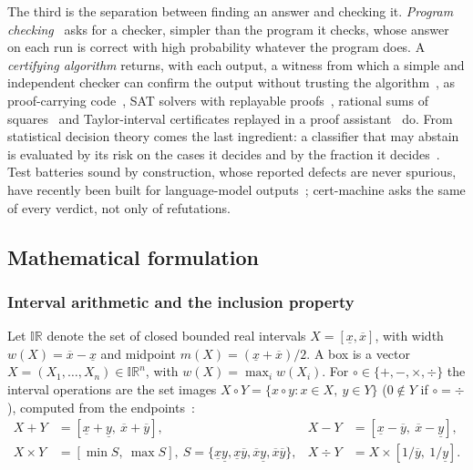 \documentclass[preprint,11pt,a4paper]{elsarticle}
\theoremstyle{definition}
\newcommand{\IR}{\mathbb{IR}}
\begin{document}
The third is the separation between finding an answer and checking it. \emph{Program checking}~\citep{BlumKannan95} asks for a checker, simpler than the program it checks, whose answer on each run is correct with high probability whatever the program does. A \emph{certifying algorithm} returns, with each output, a witness from which a simple and independent checker can confirm the output without trusting the algorithm~\citep{McConnell11}, as proof-carrying code~\citep{Necula97}, SAT solvers with replayable proofs~\citep{Wetzler14,CakeLPR21}, rational sums of squares~\citep{Parrilo03,PeyrlParrilo08} and Taylor-interval certificates replayed in a proof assistant~\citep{SolovyevHales13,Magron15,MartinDorel16} do. From statistical decision theory comes the last ingredient: a classifier that may abstain is evaluated by its risk on the cases it decides and by the fraction it decides~\citep{Chow70,ElYaniv10,Geifman17,Franc21}. Test batteries sound by construction, whose reported defects are never spurious, have recently been built for language-model outputs~\citep{Li26}; cert-machine asks the same of every verdict, not only of refutations.

\subsection{Mathematical formulation}\label{sec:math}

\subsubsection{Interval arithmetic and the inclusion property}\label{sec:intervals}

Let $\IR$ denote the set of closed bounded real intervals $X=[\underline{x},\overline{x}]$, with width $w(X)=\overline{x}-\underline{x}$ and midpoint $m(X)=(\underline{x}+\overline{x})/2$. A box is a vector $X=(X_1,\dots,X_n)\in\IR^n$, with $w(X)=\max_i w(X_i)$. For $\circ\in\{+,-,\times,\div\}$ the interval operations are the set images $X\circ Y=\{x\circ y : x\in X,\ y\in Y\}$ ($0\notin Y$ if $\circ=\div$), computed from the endpoints~\citep{Moore09,Neumaier90}:
\begin{equation}\label{eq:endpoints}
\begin{aligned}
X+Y&=[\underline{x}+\underline{y},\ \overline{x}+\overline{y}], &
X-Y&=[\underline{x}-\overline{y},\ \overline{x}-\underline{y}],\\
X\times Y&=[\min S,\ \max S],\ S=\{\underline{x}\underline{y},\underline{x}\overline{y},\overline{x}\underline{y},\overline{x}\overline{y}\}, &
X\div Y&=X\times[1/\overline{y},\ 1/\underline{y}].
\end{aligned}
\end{equation}
\end{document}
